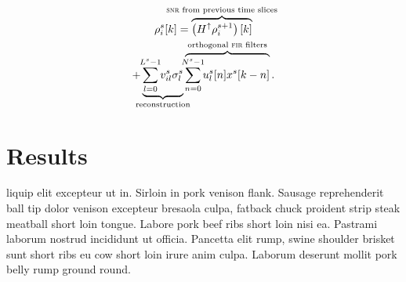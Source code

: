 \documentclass[portrait,plainboxedsections]{sciposter}
\begin{document}
\begin{minipage}[t]{0.4\textwidth}
\begin{multline}
	\rho_i^s [k] =%
		\overbrace{
			\left(H^\uparrow \rho_i^{s+1}\right)[k]
		}^\textrm{\clap{{\sc snr} from previous time slices}} \\
		+
		\underbrace{
			\sum_{\mathclap{l=0}}^{\mathclap{L^s-1}} v_{il}^s \sigma_l^s
		}_\textrm{\clap{reconstruction}}
		\overbrace{
			\sum_{\mathclap{n=0}}^{\mathclap{N^s-1}} u_l^s[n] x^s[k-n]
		}^\textrm{\clap{orthogonal {\sc fir} filters}} .
\end{multline}

\section*{Results}

liquip elit excepteur ut in. Sirloin in pork venison flank. Sausage reprehenderit ball tip dolor venison excepteur bresaola culpa, fatback chuck proident strip steak meatball short loin tongue. Labore pork beef ribs short loin nisi ea. Pastrami laborum nostrud incididunt ut officia. Pancetta elit rump, swine shoulder brisket sunt short ribs eu cow short loin irure anim culpa. Laborum deserunt mollit pork belly rump ground round.

\end{minipage}%
\hspace{0.05\textwidth}%
\end{document}
